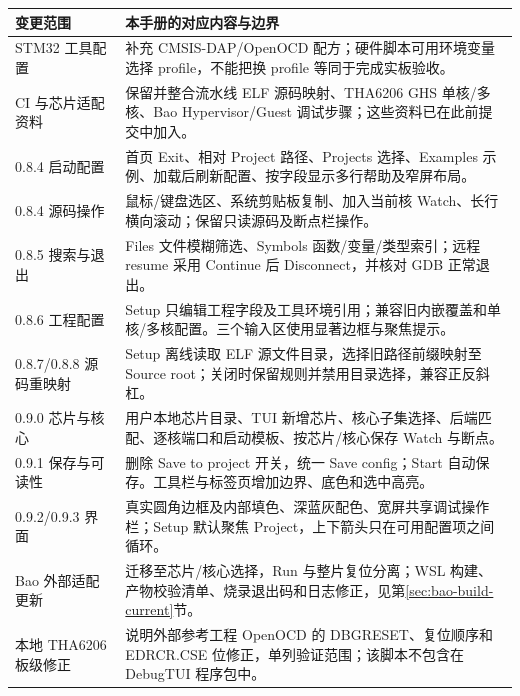 \documentclass[UTF8,a4paper,11pt,oneside,fontset=none]{ctexart}
\begin{document}
\noindent\begin{tabularx}{\linewidth}{@{}P{31mm}Y@{}}\toprule
变更范围 & 本手册的对应内容与边界\\\midrule
STM32 工具配置 & 补充 CMSIS-DAP/OpenOCD 配方；硬件脚本可用环境变量选择 profile，不能把换 profile 等同于完成实板验收。\\
CI 与芯片适配资料 & 保留并整合流水线 ELF 源码映射、THA6206 GHS 单核/多核、Bao Hypervisor/Guest 调试步骤；这些资料已在此前提交中加入。\\
0.8.4 启动配置 & 首页 Exit、相对 Project 路径、Projects 选择、Examples 示例、加载后刷新配置、按字段显示多行帮助及窄屏布局。\\
0.8.4 源码操作 & 鼠标/键盘选区、系统剪贴板复制、加入当前核 Watch、长行横向滚动；保留只读源码及断点栏操作。\\
0.8.5 搜索与退出 & Files 文件模糊筛选、Symbols 函数/变量/类型索引；远程 resume 采用 Continue 后 Disconnect，并核对 GDB 正常退出。\\
0.8.6 工程配置 & Setup 只编辑工程字段及工具环境引用；兼容旧内嵌覆盖和单核/多核配置。三个输入区使用显著边框与聚焦提示。\\
0.8.7/0.8.8 源码重映射 & Setup 离线读取 ELF 源文件目录，选择旧路径前缀映射至 Source root；关闭时保留规则并禁用目录选择，兼容正反斜杠。\\
0.9.0 芯片与核心 & 用户本地芯片目录、TUI 新增芯片、核心子集选择、后端匹配、逐核端口和启动模板、按芯片/核心保存 Watch 与断点。\\
0.9.1 保存与可读性 & 删除 Save to project 开关，统一 Save config；Start 自动保存。工具栏与标签页增加边界、底色和选中高亮。\\
0.9.2/0.9.3 界面 & 真实圆角边框及内部填色、深蓝灰配色、宽屏共享调试操作栏；Setup 默认聚焦 Project，上下箭头只在可用配置项之间循环。\\
Bao 外部适配更新 & 迁移至芯片/核心选择，Run 与整片复位分离；WSL 构建、产物校验清单、烧录退出码和日志修正，见第\ref{sec:bao-build-current}节。\\
本地 THA6206 板级修正 & 说明外部参考工程 OpenOCD 的 DBGRESET、复位顺序和 EDRCR.CSE 位修正，单列验证范围；该脚本不包含在 DebugTUI 程序包中。\\\bottomrule
\end{tabularx}


\end{document}
